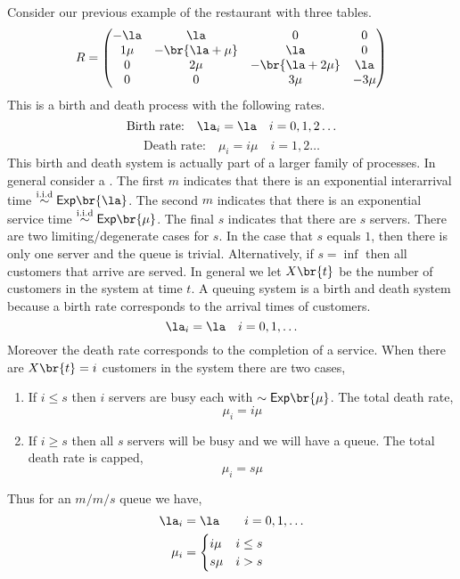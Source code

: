 \documentclass{article}
\newcommand{\Ex}{\mathsf{Exp}}
\begin{document}
    \begin{example}
        Consider our previous example of the restaurant with three tables.
        \[ R = \begin{pmatrix}
            - \la & \la & 0 & 0 \\
            1\mu & -\br{\la + \mu} & \la & 0 \\
            0 & 2\mu & -\br{\la + 2\mu} & \la \\
            0 & 0 & 3\mu & -3\mu \\
        \end{pmatrix} \]
        This is a birth and death process with the following rates.
        \[ \text{Birth rate:} \quad \la_i = \la \quad i = 0, 1, 2\ldots  \]
        \[ \text{Death rate:} \quad \mu_i = i\mu \quad i = 1, 2\ldots  \]
    This birth and death system is actually part of a larger family of processes. In general consider a . The first $m$ indicates that there is an exponential interarrival time $\stackrel{\text{i.i.d}}{\sim} \Ex\br{\la}$. The second $m$ indicates that there is an exponential service time $\stackrel{\text{i.i.d}}{\sim} \Ex\br{\mu}$. The final $s$ indicates that there are $s$ servers. There are two limiting/degenerate cases for $s$. In the case that $s$ equals $1$, then there is only one server and the queue is trivial. Alternatively, if $s = \inf$ then all customers that arrive are served. In general we let $X\br{t}$ be the number of customers in the system at time $t$. A queuing system is a birth and death system because a birth rate corresponds to the arrival times of customers.
    \[ \la_i = \la \quad i = 0, 1, \ldots\]
    Moreover the death rate corresponds to the completion of a service. When there are $X\br{t} = i$ customers in the system there are two cases,
    \begin{enumerate}
        \item If $i \leq s$ then $i$ servers are busy each with $\sim \Ex\br{\mu}$. The total death rate,
        \[ \mu_i = i \mu \]
        \item If $i \geq s$ then all $s$ servers will be busy and we will have a queue. The total death rate is capped,
        \[ \mu_i = s \mu \]
    \end{enumerate}
    Thus for an $m/m/s$ queue we have,
    \begin{align*}
    \la_i &= \la \qquad i = 0, 1,\ldots  \\
    \mu_i &= \begin{cases}
        i \mu & i\leq s \\
        s \mu & i > s
    \end{cases}
    \end{align*}
    \end{example}
\end{document}
